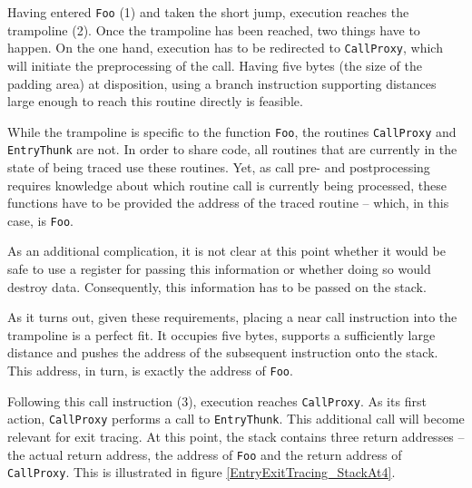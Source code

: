 Having entered \verb|Foo| (1) and taken the short jump, execution reaches the 
trampoline (2). Once the trampoline has been reached, two things have to happen. On the
one hand, execution has to be redirected to \verb|CallProxy|, which will initiate the 
preprocessing of the call. Having five bytes (the size of the padding area) at 
disposition, using a branch instruction supporting distances large enough to reach this
routine directly is feasible.

While the trampoline is specific to the function \verb|Foo|, the routines 
\verb|CallProxy| and \verb|EntryThunk| are not. In order to share code, all
routines that are currently in the state of being traced use these routines. Yet,
as call pre- and postprocessing requires knowledge about which routine call is currently 
being processed, these functions have to be provided the address of the traced
routine -- which, in this case, is \verb|Foo|.

As an additional complication, it is not clear at this point whether it 
would be safe to use a register for passing this information or whether 
doing so would destroy data. Consequently, this information has to be 
passed on the stack.

As it turns out, given these requirements, placing a near call instruction into the trampoline is a perfect fit. It occupies 
five bytes, supports a sufficiently large distance and pushes the address of 
the subsequent instruction onto the stack. This address, in turn, is exactly 
the address of \verb|Foo|.

Following this call instruction (3), execution reaches \verb|CallProxy|. As its first
action, \verb|CallProxy| performs a call to \verb|EntryThunk|. This additional call
will become relevant for exit tracing. At this point,
the stack contains three return addresses -- the actual return address, the address
of \verb|Foo| and the return address of \verb|CallProxy|. This is illustrated in 
figure \ref{EntryExitTracing_StackAt4}.

